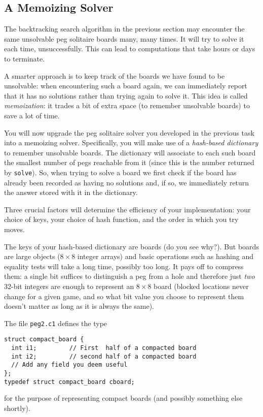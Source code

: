 \documentclass[12pt]{exam}
\begin{document}
\subsection{A Memoizing Solver}
\label{sec:task3}

The backtracking search algorithm in the previous section may
encounter the same unsolvable peg solitaire boards many, many times.
It will try to solve it each time, unsuccessfully.  This can lead
to computations that take hours or days to terminate.

A smarter approach is to keep track of the boards we have found to be
unsolvable: when encountering such a board again, we can immediately
report that it has no solutions rather than trying again to solve it.
This idea is called \emph{memoization}: it trades a bit of extra space
(to remember unsolvable boards) to save a lot of time.

You will now upgrade the peg solitaire solver you developed in the
previous task into a memoizing solver.  Specifically, you will make
use of a \emph{hash-based dictionary} to remember unsolvable boards.
The dictionary will associate to each such board the smallest number
of pegs reachable from it (since this is the number returned by
\lstinline'solve').  So, when trying to solve a board we first check
if the board has already been recorded as having no solutions and, if
so, we immediately return the answer stored with it in the dictionary.

Three crucial factors will determine the efficiency of your
implementation: your choice of keys, your choice of hash function, and
the order in which you try moves.

\medskip

The keys of your hash-based dictionary are boards (do you see why?).
But boards are large objects ($8 \times 8$ integer arrays) and basic
operations such as hashing and equality tests will take a long time,
possibly too long.  It pays off to compress them: a single bit
suffices to distinguish a peg from a hole and therefore just
\emph{two} 32-bit integers are enough to represent an $8 \times 8$
board (blocked locations never change for a given game, and so what
bit value you choose to represent them doesn't matter as long as it is
always the same).

\enlargethispage{2ex}
The file \lstinline'peg2.c1' defines the type
\begin{lstlisting}
struct compact_board {
  int i1;         // First  half of a compacted board
  int i2;         // second half of a compacted board
  // Add any field you deem useful
};
typedef struct compact_board cboard;
\end{lstlisting}
for the purpose of representing compact boards (and possibly something
else shortly).
\end{document}
